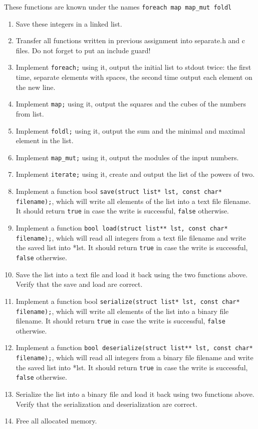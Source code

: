 \documentclass[12pt, a4paper]{article}
\begin{document}
These functions are known under the names \texttt{foreach map map\_mut foldl}
\begin{enumerate}
  \item Save these integers in a linked list.
  \item Transfer all functions written in previous assignment into separate.h and c files. Do not forget to
  put an include guard!
  \item Implement \texttt{foreach;} using it, output the initial list to stdout twice: the first time, separate elements
  with spaces, the second time output each element on the new line.
  \item Implement \texttt{map;} using it, output the squares and the cubes of the numbers from list.
  \item Implement \texttt{foldl;} using it, output the sum and the minimal and maximal element in the list.
  \item Implement \texttt{map\_mut;} using it, output the modules of the input numbers.
  \item Implement \texttt{iterate;} using it, create and output the list of the powers of two.
  \item Implement a function bool \texttt{save(struct list* lst, const char* filename);}, which will write all elements of the list into a text file filename. It should return \texttt{true} in case the write is successful, \texttt{false} otherwise.
  \item Implement a function \texttt{bool load(struct list** lst, const char* filename);}, which will read all integers from a text file filename and write the saved list into *lst. It should return \texttt{true} in case the write is successful, \texttt{false} otherwise.
  \item Save the list into a text file and load it back using the two functions above. Verify that the save and load are correct.
  \item Implement a function bool \texttt{serialize(struct list* lst, const char* filename);}, which will write all elements of the list into a binary file filename. It should return \texttt{true} in case the write is successful, \texttt{false} otherwise.
  \item Implement a function \texttt{bool deserialize(struct list** lst, const char* filename);}, which will read all integers from a binary file filename and write the saved list into *lst. It should return \texttt{true} in case the write is successful, \texttt{false} otherwise.
  \item Serialize the list into a binary file and load it back using two functions above. Verify that the serialization and deserialization are correct.
  \item Free all allocated memory.
\end{enumerate}
\end{document}
